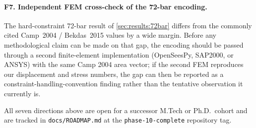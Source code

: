 \paragraph{F7. Independent FEM cross-check of the 72-bar
encoding.} The hard-constraint 72-bar result of
\cref{sec:results:72bar} differs from the commonly cited
Camp~2004 / Bekdas~2015 values by a wide margin. Before any
methodological claim can be made on that gap, the encoding
should be passed through a second finite-element
implementation (OpenSeesPy, SAP2000, or ANSYS) with the same
Camp 2004 area vector; if the second FEM reproduces our
displacement and stress numbers, the gap can then be reported
as a constraint-handling-convention finding rather than the
tentative observation it currently is.

\bigskip
\noindent
All seven directions above are open for a successor M.Tech or
Ph.D.\ cohort and are tracked in
\texttt{docs/ROADMAP.md} at the \texttt{phase-10-complete}
repository tag.
